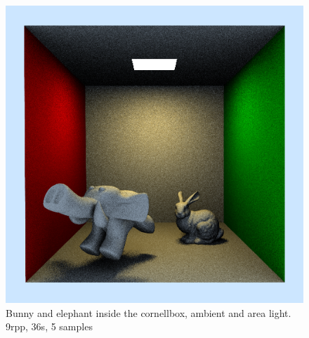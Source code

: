  \begin{figure}[h]
	\centering
	\includegraphics[width=\textwidth]{week4/box_bunny_elephant_ambient_area_9rpp_36s.png}
	\caption{Bunny and elephant inside the cornellbox, ambient and area light. 9rpp, 36s, 5 samples}
	\label{fig:cornellbunnyelephantambientarea}
 \end{figure}
 

